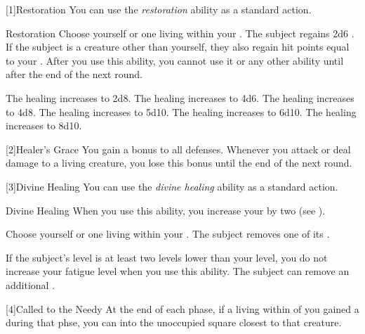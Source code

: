         [1]{Restoration} You can use the \textit{restoration} ability as a standard action.
        \begin{instantability}{Restoration}
            \rankline
            Choose yourself or one living  within your .
            The subject regains 2d6 .
            If the subject is a creature other than yourself, they also regain hit points equal to your .
            After you use this ability, you cannot use it or any other  ability until after the end of the next round.

            \rankline
             The healing increases to 2d8.
             The healing increases to 4d6.
             The healing increases to 4d8.
             The healing increases to 5d10.
             The healing increases to 6d10.
             The healing increases to 8d10.
        \end{instantability}

        [2]{Healer's Grace} You gain a  bonus to all defenses.
        Whenever you attack or deal damage to a living creature, you lose this bonus until the end of the next round.

        [3]{Divine Healing} You can use the \textit{divine healing} ability as a standard action.
        \begin{instantability}{Divine Healing}
            \rankline
            When you use this ability, you increase your  by two (see ).

            Choose yourself or one living  within your .
            The subject removes one of its .

            \rankline
             If the subject's level is at least two levels lower than your level,
                you do not increase your fatigue level when you use this ability.
             The subject can remove an additional .
        \end{instantability}

        [4]{Called to the Needy} At the end of each phase, if a living  within \distrange of you gained a  during that phse, you can  into the unoccupied square closest to that creature.

